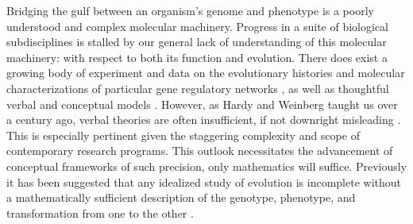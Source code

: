 \documentclass[9 pt]{article}
\newcommand{\1}{\mathbbm{1}}
\begin{document}
\begin{multicols}{2}
Bridging the gulf between an organism's genome and phenotype is a poorly understood and complex molecular machinery. Progress in a suite of biological subdisciplines is stalled by our general lack of understanding of this molecular machinery: with respect to both its function and evolution. There does exist a growing body of experiment and data on the evolutionary histories and molecular characterizations of particular gene regulatory networks \citep{jaeger2011gap, davidson2006gene, israel2016comparative}, as well as thoughtful verbal and conceptual models \citep{true2001developmental, gwagner1, weiss2000phenogenetic, edelman2001degeneracy}. However, as Hardy and Weinberg taught us over a century ago, verbal theories are often insufficient, if not downright misleading \citep{hardy1908mendelian, weinberg1908vererbungsgesetze, servedio2014not}. This is especially pertinent given the staggering complexity and scope of contemporary research programs. This outlook necessitates the advancement of conceptual frameworks of such precision, only mathematics will suffice. Previously it has been suggested that any idealized study of evolution is incomplete without a mathematically sufficient description of the genotype, phenotype, and transformation from one to the other \citep{Lewontin1974genetic}.%





\end{multicols}
\end{document}
